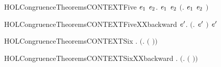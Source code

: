 \newcommand{\HOLCongruenceTheoremsCONTEXTFourXXbackward}{\UseVerbatim{HOLCongruenceTheoremsCONTEXTFourXXbackward}}
\begin{SaveVerbatim}{HOLCongruenceTheoremsCONTEXTFive}
\HOLTokenTurnstile{} \HOLSymConst{\HOLTokenForall{}}\ensuremath{\HOLBoundVar{e}\sb{\mathrm{1}}} \ensuremath{\HOLBoundVar{e}\sb{\mathrm{2}}}.  \ensuremath{\HOLBoundVar{e}\sb{\mathrm{1}}} \HOLSymConst{\HOLTokenConj{}}  \ensuremath{\HOLBoundVar{e}\sb{\mathrm{2}}} \HOLSymConst{\HOLTokenImp{}}  \ensuremath{(}\HOLTokenLambda{}. \ensuremath{\HOLBoundVar{e}\sb{\mathrm{1}}}  \HOLSymConst{\ensuremath{\mid}} \ensuremath{\HOLBoundVar{e}\sb{\mathrm{2}}} \ensuremath{)}
\end{SaveVerbatim}
\newcommand{\HOLCongruenceTheoremsCONTEXTFive}{\UseVerbatim{HOLCongruenceTheoremsCONTEXTFive}}
\begin{SaveVerbatim}{HOLCongruenceTheoremsCONTEXTFiveXXbackward}
\HOLTokenTurnstile{} \HOLSymConst{\HOLTokenForall{}} \ensuremath{\HOLBoundVar{e}\sp{\prime}}.  \ensuremath{(}\HOLTokenLambda{}.   \HOLSymConst{\ensuremath{\mid}} \ensuremath{\HOLBoundVar{e}\sp{\prime}} \ensuremath{)} \HOLSymConst{\HOLTokenImp{}}   \HOLSymConst{\HOLTokenConj{}}  \ensuremath{\HOLBoundVar{e}\sp{\prime}}
\end{SaveVerbatim}
\newcommand{\HOLCongruenceTheoremsCONTEXTFiveXXbackward}{\UseVerbatim{HOLCongruenceTheoremsCONTEXTFiveXXbackward}}
\begin{SaveVerbatim}{HOLCongruenceTheoremsCONTEXTSix}
\HOLTokenTurnstile{} \HOLSymConst{\HOLTokenForall{}} .   \HOLSymConst{\HOLTokenImp{}}  \ensuremath{(}\HOLTokenLambda{}.   \ensuremath{(} \ensuremath{)}\ensuremath{)}
\end{SaveVerbatim}
\newcommand{\HOLCongruenceTheoremsCONTEXTSix}{\UseVerbatim{HOLCongruenceTheoremsCONTEXTSix}}
\begin{SaveVerbatim}{HOLCongruenceTheoremsCONTEXTSixXXbackward}
\HOLTokenTurnstile{} \HOLSymConst{\HOLTokenForall{}} .  \ensuremath{(}\HOLTokenLambda{}.   \ensuremath{(} \ensuremath{)}\ensuremath{)} \HOLSymConst{\HOLTokenImp{}}  
\end{SaveVerbatim}
